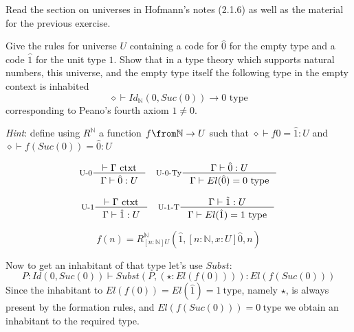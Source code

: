 \begin{exercise}
  Read the section on universes in Hofmann's notes (2.1.6) as well as the
  material for the previous exercise.

  Give the rules for universe $U$ containing a code for $\hat{0}$ for the empty
  type and a code $\hat{1}$ for the unit type $1$. Show that in a type theory
  which supports natural numbers, this universe, and the empty type itself the
  following type in the empty context is inhabited
  \[
    \diamond \vdash Id_\mathbb{N}(0, Suc(0)) \to 0 \text{ type}
  \]
  corresponding to Peano's fourth axiom $1 \neq 0$.

  \emph{Hint}: define using $R^\mathbb{N}$ a function $f \from \mathbb{N} \to
  U$ such that $\diamond \vdash f 0 = \hat{1}: U$ and $\diamond \vdash
  f(Suc(0)) = \hat{0} : U$
\end{exercise}
\begin{answer}
  \[
    \inference[U-0]{\vdash \Gamma~\text{ctxt}}{\Gamma \vdash \hat{0} : U}\quad
    \inference[U-0-Ty]{\Gamma \vdash \hat{0}: U}{\Gamma \vdash El(\hat{0}) = 0~\text{type}}
  \]

  \[
    \inference[U-1]{\vdash \Gamma~\text{ctxt}}{\Gamma \vdash \hat{1} : U}\quad
    \inference[U-1-T]{\Gamma \vdash \hat{1} : U}{\Gamma \vdash El(\hat{1}) = 1~\text{type}}
  \]

  \[
    f(n) = R^\mathbb{N}_{[n:\mathbb{N}]U}(\hat{1}, [n: \mathbb{N}, x: U]\hat{0}, n)
  \]

  Now to get an inhabitant of that type let's use $\mathit{Subst}$:
  \[
    P : Id(0, Suc(0)) \vdash \mathit{Subst}(P, (\star : El(f(0)))) : El(f(Suc(0)))
  \]
  Since the inhabitant to $El(f(0)) = El(\hat{1}) = 1~\text{type}$, namely
  $\star$, is always present by the formation rules, and $El(f(Suc(0))) =
  0~\text{type}$ we obtain an inhabitant to the required type.
\end{answer}



